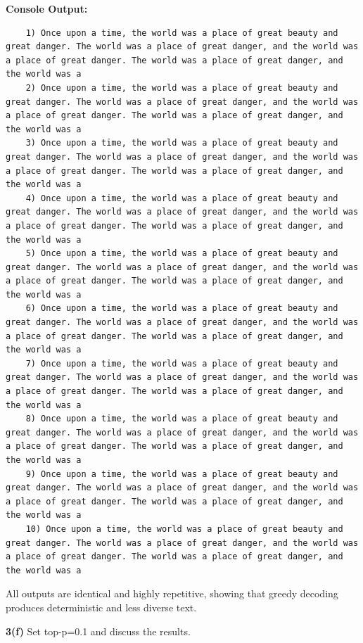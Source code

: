 \documentclass[10pt]{article}
\begin{document}
\textbf{Console Output:}
\begin{lstlisting}
	1) Once upon a time, the world was a place of great beauty and great danger. The world was a place of great danger, and the world was a place of great danger. The world was a place of great danger, and the world was a
	2) Once upon a time, the world was a place of great beauty and great danger. The world was a place of great danger, and the world was a place of great danger. The world was a place of great danger, and the world was a
	3) Once upon a time, the world was a place of great beauty and great danger. The world was a place of great danger, and the world was a place of great danger. The world was a place of great danger, and the world was a
	4) Once upon a time, the world was a place of great beauty and great danger. The world was a place of great danger, and the world was a place of great danger. The world was a place of great danger, and the world was a
	5) Once upon a time, the world was a place of great beauty and great danger. The world was a place of great danger, and the world was a place of great danger. The world was a place of great danger, and the world was a
	6) Once upon a time, the world was a place of great beauty and great danger. The world was a place of great danger, and the world was a place of great danger. The world was a place of great danger, and the world was a
	7) Once upon a time, the world was a place of great beauty and great danger. The world was a place of great danger, and the world was a place of great danger. The world was a place of great danger, and the world was a
	8) Once upon a time, the world was a place of great beauty and great danger. The world was a place of great danger, and the world was a place of great danger. The world was a place of great danger, and the world was a
	9) Once upon a time, the world was a place of great beauty and great danger. The world was a place of great danger, and the world was a place of great danger. The world was a place of great danger, and the world was a
	10) Once upon a time, the world was a place of great beauty and great danger. The world was a place of great danger, and the world was a place of great danger. The world was a place of great danger, and the world was a
\end{lstlisting}

All outputs are identical and highly repetitive, showing that greedy decoding produces deterministic and less diverse text.

\textbf{3(f)} Set top-p=0.1 and discuss the results.
\end{document}
